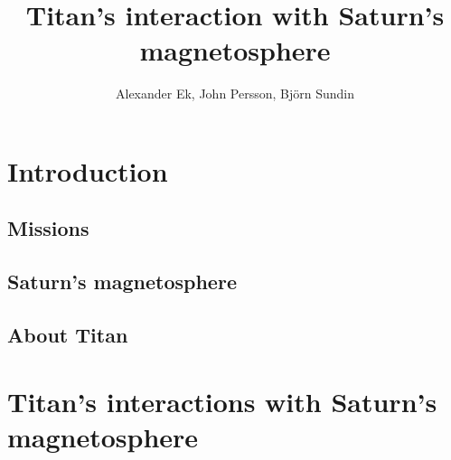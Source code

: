 \documentclass[12pt, titlepage, parskip=full*]{scrartcl}
\title{Titan's interaction with Saturn's magnetosphere}
\author{Alexander Ek, John Persson, Björn Sundin}
\begin{document}
\maketitle

\tableofcontents
\newpage

\section{Introduction}
\subsection{Missions}
\subsection{Saturn's magnetosphere}

\subsection{About Titan}


\section{Titan's interactions with Saturn's magnetosphere}

\parencite{solar-system-magnetospheres}



\printbibliography
\end{document}
